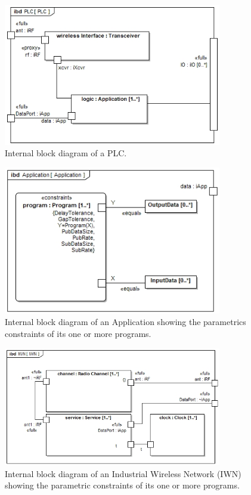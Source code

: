 \begin{figure}[!th]
	\centering
	\includegraphics[width=0.85\textwidth]{chapter-conclusions/images/PLC}
	\caption{Internal block diagram of a PLC.}
	\label{fig:concl:plc-ibd}
\end{figure}

\begin{figure}[!th]
	\centering
	\includegraphics[width=0.85\textwidth]{chapter-conclusions/images/Application}
	\caption{Internal block diagram of an Application showing the parametrics constraints of its one or more programs.}
	\label{fig:concl:Application-ibd}
\end{figure}

\begin{figure}[!th]
	\centering
	\includegraphics[width=0.85\textwidth]{chapter-conclusions/images/IWN}
	\caption{Internal block diagram of an Industrial Wireless Network (IWN) showing the parametric constraints of its one or more programs.}
	\label{fig:concl:iwn-ibd}
\end{figure}

